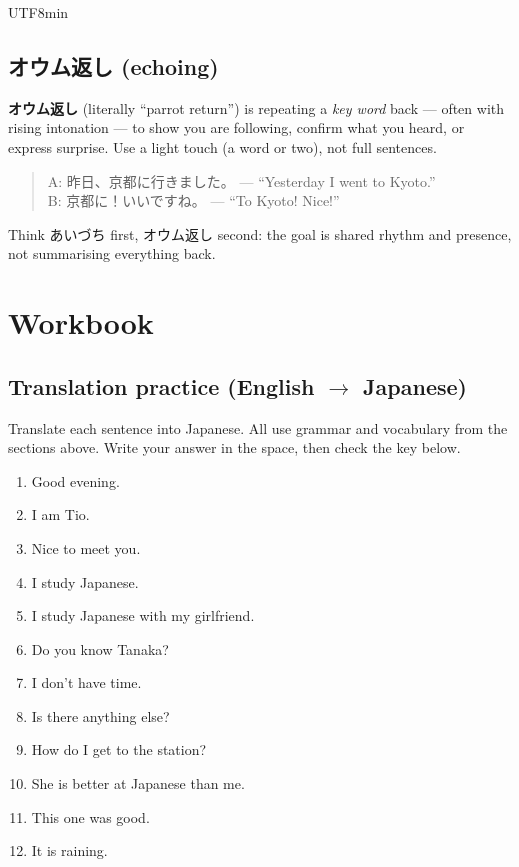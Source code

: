 \documentclass[11pt]{article}
\begin{document}
\begin{CJK}{UTF8}{min}
\subsection{\texorpdfstring{オウム返し}{oumu-gaeshi} (echoing)}
\textbf{オウム返し} (literally ``parrot return'') is repeating a \emph{key word}
back --- often with rising intonation --- to show you are following, confirm
what you heard, or express surprise. Use a light touch (a word or two), not full
sentences.
\begin{quote}
A: 昨日、京都に行きました。 --- ``Yesterday I went to Kyoto.''\\
B: 京都に！いいですね。 --- ``To Kyoto! Nice!''
\end{quote}
Think あいづち first, オウム返し second: the goal is shared rhythm and presence,
not summarising everything back.

\section{Workbook}

\subsection{Translation practice (English $\rightarrow$ Japanese)}
Translate each sentence into Japanese. All use grammar and vocabulary from the
sections above. Write your answer in the space, then check the key below.

\begin{enumerate}
  \item Good evening. \vspace{1.5em}
  \item I am Tio. \vspace{1.5em}
  \item Nice to meet you. \vspace{1.5em}
  \item I study Japanese. \vspace{1.5em}
  \item I study Japanese with my girlfriend. \vspace{1.5em}
  \item Do you know Tanaka? \vspace{1.5em}
  \item I don't have time. \vspace{1.5em}
  \item Is there anything else? \vspace{1.5em}
  \item How do I get to the station? \vspace{1.5em}
  \item She is better at Japanese than me. \vspace{1.5em}
  \item This one was good. \vspace{1.5em}
  \item It is raining. \vspace{1.5em}
\end{enumerate}


\end{CJK}
\end{document}
